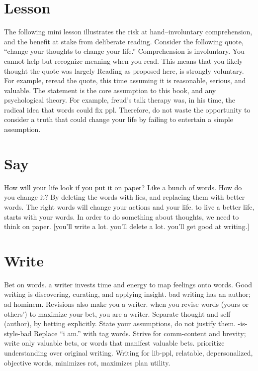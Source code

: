 \documentclass[
]{book}
\begin{document}
\hypertarget{lesson}{%
\section{Lesson}\label{lesson}}

The following mini lesson illustrates the risk at hand--involuntary comprehension, and the benefit at stake from deliberate reading.
Consider the following quote, ``change your thoughts to change your life.''
Comprehension is involuntary.
You cannot help but recognize meaning when you read.
This means that you likely thought the quote was largely
Reading as proposed here, is strongly voluntary.
For example, reread the quote, this time assuming it is reasonable, serious, and valuable.
The statement is the core assumption to this book, and any psychological theory.
For example, freud's talk therapy was, in his time, the radical idea that words could fix ppl.
Therefore, do not waste the opportunity to consider a truth that could change your life by failing to entertain a simple assumption.

\hypertarget{say}{%
\section{Say}\label{say}}

How will your life look if you put it on paper? Like a bunch of words.
How do you change it? By deleting the words with lies, and replacing them with better words.
The right words will change your actions and your life. to live a better life, starts with your words.
In order to do something about thoughts, we need to think on paper. {[}you'll write a lot. you'll delete a lot. you'll get good at writing.{]}

\hypertarget{write}{%
\section{Write}\label{write}}

Bet on words. a writer invests time and energy to map feelings onto words.
Good writing is discovering, curating, and applying insight. bad writing has an author; ad hominem.
Revisions also make you a writer. when you revise words (yours or others') to maximize your bet, you are a writer.
Separate thought and self (author), by betting explicitly.
State your assumptions, do not justify them. -is-style-bad
Replace ``i am.'' with tag words.
Strive for comm-content and brevity; write only valuable bets, or words that manifest valuable bets. prioritize understanding over original writing.
Writing for lib-ppl, relatable, depersonalized, objective words, minimizes rot, maximizes plan utility.
\end{document}
